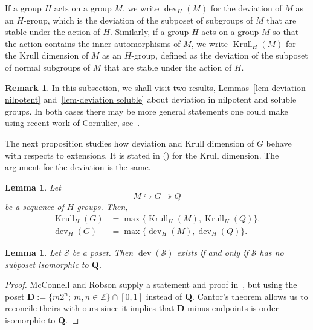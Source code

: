 \documentclass[11pt]{article}
\newtheorem{lemm}[theo]{Lemma}
\theoremstyle{definition}
\newtheorem{rema}[theo]{Remark}
\numberwithin{equation}{section}
\numberwithin{figure}{section}
\numberwithin{table}{section}
\newcommand{\Z}{\mathbb{Z}}
\DeclareMathOperator{\dev}{dev}
\DeclareMathOperator{\krull}{Krull}
\begin{document}
If a group $H$ acts on a group $M$, we write $\dev_H(M)$ for the deviation of $M$ as an $H$-group, which is the deviation of the subposet of subgroups of $M$ that are stable under the action of $H$. Similarly, if a group $H$ acts on a group $M$ so that the action contains the inner automorphisms of $M$, we write $\krull_H(M)$ for the Krull dimension of $M$ as an $H$-group, defined as the deviation of the subposet of normal subgroups of $M$ that are stable under the action of $H$.


\begin{rema}
In this subsection, we shall visit two results, Lemmas~\ref{lem-deviation nilpotent} and~\ref{lem-deviation soluble} about deviation in nilpotent and soluble groups. In both cases there may be more general statements one could make using recent work of Cornulier, see~\cite[Theorem~1.4]{Cor18}.
\end{rema}


The next proposition studies how deviation and Krull dimension of $G$ behave with respects to extensions. It is stated in (\cite[Lemma~2.24]{J}) for the Krull dimension. The argument for the deviation is the same.


\begin{lemm}\label{lem-kdim g gps2}
Let
\begin{equation*}
M \hookrightarrow G \twoheadrightarrow Q
\end{equation*}
be a sequence of $H$-groups. Then,
\begin{align*}
\krull_H (G) & = \max \{ \krull_H (M), \krull_H (Q)\}, \\
\dev_H(G) & = \max \{ \dev_H(M), \dev_H(Q)\}.
\end{align*}
\end{lemm}



\begin{lemm}
Let $\mathcal S$ be a poset. Then $\dev(\mathcal S)$ exists if and only if $\mathcal S$ has no subposet isomorphic to $\mathbf{Q}$.
\end{lemm}
\begin{proof}
McConnell and Robson supply a statement and proof in~\cite[Chapter~6, \S1.13]{MR}, but using the poset $\mathbf D:=\{m2^n;\ m,n\in\Z\}\cap[0,1]$ instead of $\mathbf Q$. Cantor's theorem allows us to reconcile theirs with ours since it implies that $\mathbf D$ minus endpoints is order-isomorphic to $\mathbf Q$.
\end{proof}
\end{document}
